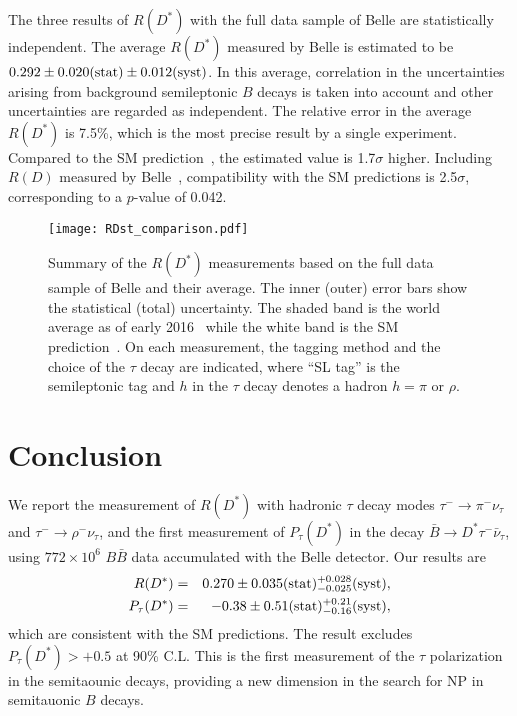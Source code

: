 \documentclass[aps,prd,twocolumn,superscriptaddress,showpacs,preprintnumbers,amsmath,amssymb]{revtex4-1}
\begin{document}
The three results of $R(D^*)$ with the full data sample of Belle are statistically independent. The average $R(D^*)$ measured by Belle is estimated to be $0.292 \pm 0.020 ({\rm stat}) \pm 0.012 ({\rm syst})$. In this average, correlation in the uncertainties arising from background semileptonic $B$ decays is taken into account and other uncertainties are regarded as independent. The relative error in the average $R(D^*)$ is 7.5\%, which is the most precise result by a single experiment. Compared to the SM prediction~\cite{cite:RDst:2012}, the estimated value is 1.7$\sigma$ higher. Including $R(D)$ measured by Belle~\cite{cite:Belle:2015}, compatibility with the SM predictions is 2.5$\sigma$, corresponding to a $p$-value of 0.042.

\begin{figure}[t!]
  \centering
  \texttt{[image: RDst\_comparison.pdf]}
  \caption{Summary of the $R(D^*)$ measurements based on the full data sample of Belle and their average. The inner (outer) error bars show the statistical (total) uncertainty. The shaded band is the world average as of early 2016~\cite{cite:HFLAV:2014} while the white band is the SM prediction~\cite{cite:RDst:2012}. On each measurement, the tagging method and the choice of the $\tau$ decay are indicated, where ``SL tag'' is the semileptonic tag and $h$ in the $\tau$ decay denotes a hadron $h = \pi$ or $\rho$.}
  \label{fig:average}
\end{figure}

\section{Conclusion}

We report the measurement of $R(D^*)$ with hadronic $\tau$ decay modes $\tau^- \rightarrow \pi^- \nu_{\tau}$ and $\tau^- \rightarrow \rho^- \nu_{\tau}$, and the first measurement of $P_\tau(D^*)$ in the decay ${\bar B} \rightarrow D^* \tau^- {\bar \nu_{\tau}}$, using $772 \times 10^6$ $B\bar{B}$ data accumulated with the Belle detector. Our results are
\begin{eqnarray}
  R(D^*)   &=& 0.270 \pm 0.035 ({\rm stat}) ^{+0.028} _{-0.025} ({\rm syst}),\\
  P_\tau(D^*) &=& -0.38 \pm 0.51 ({\rm stat}) ^{+0.21} _{-0.16} ({\rm syst}),
\end{eqnarray}
which are consistent with the SM predictions. The result excludes $P_\tau(D^*) > +0.5$ at 90\% C.L. This is the first measurement of the $\tau$ polarization in the semitaounic decays, providing a new dimension in the search for NP in semitauonic $B$ decays.
\end{document}

